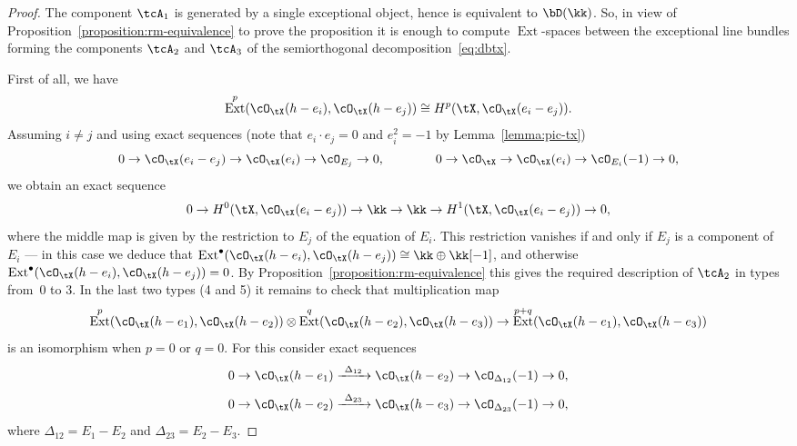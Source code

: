 \documentclass[11pt]{amsart}
\DeclareMathOperator{\Ext}{\mathrm{Ext}}
\theoremstyle{plain}
\theoremstyle{definition}
\theoremstyle{remark}
\begin{document}
\begin{proof}
The component $\tcA_1$ is generated by a single exceptional object, hence is equivalent to $\bD(\kk)$.
So, in view of Proposition~\ref{proposition:rm-equivalence} to prove the proposition it is enough to compute $\Ext$-spaces 
between the exceptional line bundles forming the components $\tcA_2$ and $\tcA_3$ of the semiorthogonal decomposition~\eqref{eq:dbtx}.

First of all, we have
\begin{equation*}
\Ext^p(\cO_\tX(h-e_i), \cO_\tX(h-e_j)) \cong H^p(\tX, \cO_\tX(e_i - e_j)).
\end{equation*}
Assuming $i \ne j$ and using exact sequences (note that $e_i\cdot e_j = 0$ and $e_i^2 = -1$ by Lemma~\ref{lemma:pic-tx})
\begin{equation*}
0 \to \cO_\tX(e_i - e_j) \to \cO_\tX(e_i) \to \cO_{E_j} \to 0,
\qquad\qquad
0 \to \cO_\tX \to \cO_\tX(e_i) \to \cO_{E_i}(-1) \to 0,
\end{equation*}
we obtain an exact sequence
\begin{equation*}
0 \to H^0(\tX, \cO_\tX(e_i - e_j)) \to \kk \to \kk \to H^1(\tX, \cO_\tX(e_i - e_j)) \to 0,
\end{equation*}
where the middle map is given by the restriction to $E_j$ of the equation of $E_i$.
This restriction vanishes if and only if $E_j$ is a component of $E_i$ --- in this case we deduce that $\Ext^\bullet(\cO_\tX(h-e_i), \cO_\tX(h-e_j)) \cong \kk \oplus \kk[-1]$,
and otherwise $\Ext^\bullet(\cO_\tX(h-e_i), \cO_\tX(h-e_j)) = 0$.
By Proposition~\ref{proposition:rm-equivalence} this gives the required description of $\tcA_2$ in types from~0 to 3.
In the last two types (4 and 5) it remains to check that multiplication map
\begin{equation}\label{eq:multiplication-ext-tx}
\Ext^p(\cO_\tX(h-e_1),\cO_\tX(h-e_2)) \otimes \Ext^q(\cO_\tX(h-e_2),\cO_\tX(h-e_3)) \to \Ext^{p+q}(\cO_\tX(h-e_1),\cO_\tX(h-e_3))
\end{equation}
is an isomorphism when $p = 0$ or $q = 0$.
For this consider exact sequences
\begin{equation}\label{eq:e12}
0 \to \cO_\tX(h - e_1) \xrightarrow{\ \Delta_{12}\ } \cO_\tX(h - e_2) \to \cO_{\Delta_{12}}(-1) \to 0,
\end{equation}
\begin{equation}\label{eq:e23}
0 \to \cO_\tX(h - e_2) \xrightarrow{\ \Delta_{23}\ } \cO_\tX(h - e_3) \to \cO_{\Delta_{23}}(-1) \to 0,
\end{equation}
where $\Delta_{12} = E_1 - E_2$ and $\Delta_{23} = E_2 - E_3$.

\end{proof}
\end{document}
